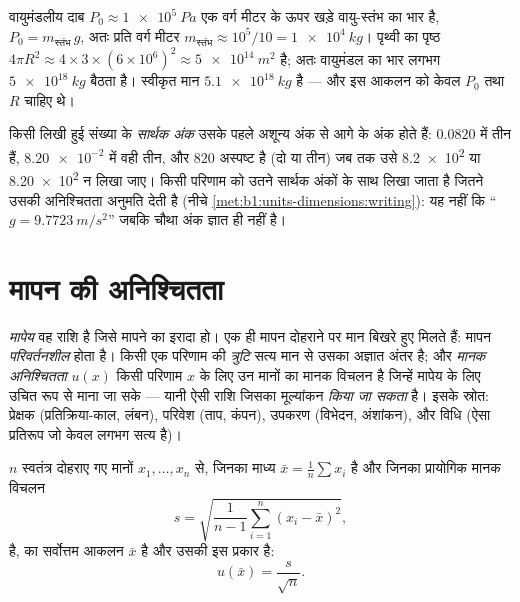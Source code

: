 \begin{example}[वायुमंडल का द्रव्यमान]\label{ex:b1:units-dimensions:atmosphere}
वायुमंडलीय दाब $P_0 \approx \qty{1e5}{Pa}$ एक वर्ग मीटर के ऊपर खड़े वायु-स्तंभ
का भार है, $P_0 = m_{\text{स्तंभ}}\,g$, अतः प्रति वर्ग मीटर
$m_{\text{स्तंभ}} \approx 10^5/10 = \qty{1e4}{kg}$। पृथ्वी का पृष्ठ
$4\pi R^2 \approx 4 \times 3 \times (6\times10^6)^2
\approx \qty{5e14}{m^2}$ है; अतः वायुमंडल का भार लगभग
$\qty{5e18}{kg}$ बैठता है। स्वीकृत मान $\qty{5.1e18}{kg}$ है --- और इस आकलन
को केवल $P_0$ तथा $R$ चाहिए थे।
\end{example}

\begin{definition}[सार्थक अंक]\label{def:b1:units-dimensions:sigfig}
किसी लिखी हुई संख्या के \emph{सार्थक अंक} उसके पहले अशून्य अंक से आगे के अंक
होते हैं: $0.0820$ में तीन हैं, $\num{8.20e-2}$ में वही तीन, और $820$ अस्पष्ट
है (दो या तीन) जब तक उसे \num{8.2e2} या \num{8.20e2} न लिखा जाए। किसी परिणाम
को उतने सार्थक अंकों के साथ लिखा जाता है जितने उसकी अनिश्चितता अनुमति देती है
(नीचे \cref{met:b1:units-dimensions:writing}): यह नहीं कि
``$g = \qty{9.7723}{m/s^2}$'' जबकि चौथा अंक ज्ञात ही नहीं है।
\end{definition}

\section{मापन की अनिश्चितता}

\begin{definition}[मापेय, त्रुटि, अनिश्चितता]\label{def:b1:units-dimensions:uncertainty}
\emph{मापेय} वह राशि है जिसे मापने का इरादा हो। एक ही मापन दोहराने पर मान
बिखरे हुए मिलते हैं: मापन \emph{परिवर्तनशील} होता है। किसी एक परिणाम की
\emph{त्रुटि} सत्य मान से उसका अज्ञात अंतर है; और \emph{मानक अनिश्चितता}
$u(x)$ किसी परिणाम $x$ के लिए उन मानों का मानक विचलन है जिन्हें मापेय के लिए
उचित रूप से माना जा सके --- यानी ऐसी राशि जिसका मूल्यांकन \emph{किया जा
सकता} है। इसके स्रोत: प्रेक्षक (प्रतिक्रिया-काल, लंबन), परिवेश (ताप,
कंपन), उपकरण (विभेदन, अंशांकन), और विधि (ऐसा प्रतिरूप जो केवल लगभग सत्य है)।
\end{definition}

\begin{proposition}[प्रकार A का मूल्यांकन]\label{prop:b1:units-dimensions:typeA}
$n$ स्वतंत्र दोहराए गए मानों $x_1, \dots, x_n$ से, जिनका माध्य
$\bar x = \frac1n \sum x_i$ है और जिनका प्रायोगिक मानक विचलन
\[
s = \sqrt{\frac{1}{n-1}\sum_{i=1}^n (x_i - \bar x)^2},
\]
है,  का सर्वोत्तम आकलन $\bar x$ है और उसकी  इस प्रकार है:
\[
u(\bar x) = \frac{s}{\sqrt n} .
\]
\end{proposition}

